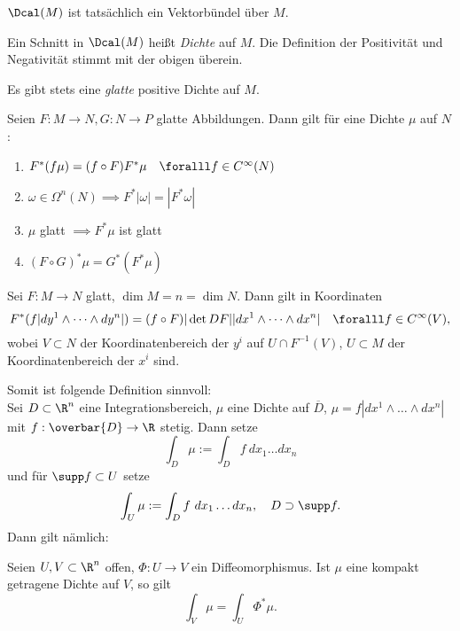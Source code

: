\begin{lem}\autolabel
	\( \Dcal(M) \) ist tatsächlich ein Vektorbündel über $M$.
\end{lem}

Ein Schnitt in $\Dcal(M)$ heißt \emph{Dichte} auf $M$. Die Definition der Positivität und Negativität stimmt mit der obigen überein.

\begin{lem}\autolabel
	Es gibt stets eine \emph{glatte} positive Dichte auf $M$.
\end{lem}

\begin{lem}\autolabel
	Seien \( F: M \to N, G: N \to P \) glatte Abbildungen. Dann gilt für eine Dichte $\mu$ auf $N$:
	\begin{enumerate}[label={\roman*})]
		\item \( F^*(f\mu) = (f \circ F)F^*\mu \quad \foralll f \in C^\infty(N) \)
		\item \( \omega \in \Omega^n(N) \implies F^*|\omega| = |F^*\omega| \)
		\item $\mu$ glatt $\implies F^*\mu$ ist glatt
		\item \( (F \circ G)^* \mu = G^*(F^*\mu) \)
	\end{enumerate}
\end{lem}

\begin{lem}\autolabel
	Sei $F:M \to N$ glatt, \( \dim M = n = \dim N \). Dann gilt in Koordinaten
	\[ F^*(f |dy^1 \wedge \dots \wedge dy^n|) = (f\circ F) |\det DF| |dx^1 \wedge \dots \wedge dx^n| \quad \foralll f \in C^\infty(V), \]
	wobei $V \subset N$ der Koordinatenbereich der $y^i$ auf \( U \cap F^{-1}(V) \), \( U \subset M \) der Koordinatenbereich der $x^i$ sind.
\end{lem}

Somit ist folgende Definition sinnvoll:\\
Sei $D \subset \R^n$ eine Integrationsbereich, \( \mu \) eine Dichte auf $\overbar{D}$, \( \mu = f |dx^1 \wedge \dots \wedge dx^n| \) mit $f: \overbar{D} \to \R$ stetig. Dann setze
\[ \int_D \mu := \int_D f \ dx_1 \dots dx_n \]
und für \( \supp f \subset U \) setze
\[ \int_U \mu := \int_D f \ dx_1 \dots dx_n, \quad D \supset \supp f. \]
Dann gilt nämlich:

\begin{lem}\autolabel
	Seien \( U,V \subset \R^n \) offen, \( \Phi: U \to V \) ein Diffeomorphismus. Ist $\mu$ eine kompakt getragene Dichte auf $V$, so gilt
	\[ \int_V \mu = \int_U \Phi^*\mu. \]
\end{lem}

